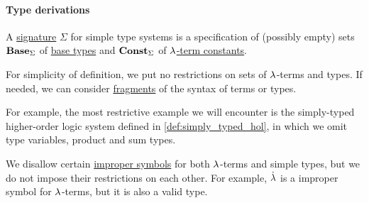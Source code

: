 \paragraph{Type derivations}

\begin{definition}\label{def:simple_type_signature}\mimprovised
  A \hyperref[con:logical_system_signature]{signature} \( \Sigma \) for simple type systems is a specification of (possibly empty) sets \( \op*{Base}_\Sigma \) of \hyperref[def:simple_type]{base types} and \( \op*{Const}_\Sigma \) of \hyperref[def:lambda_term]{\( {\mathrm \lambda} \)-term constants}.
\end{definition}
\begin{comments}
  \item For simplicity of definition, we put no restrictions on sets of \( {\mathrm \lambda} \)-terms and types. If needed, we can consider \hyperref[con:syntax_fragment]{fragments} of the syntax of terms or types.

  For example, the most restrictive example we will encounter is the simply-typed higher-order logic system defined in \cref{def:simply_typed_hol}, in which we omit type variables, product and sum types.

  \item We disallow certain \hyperref[con:improper_symbol]{improper symbols} for both \( {\mathrm \lambda} \)-terms and simple types, but we do not impose their restrictions on each other. For example, \( \mathord{\dot{{\mathrm \lambda}}} \) is a improper symbol for \( {\mathrm \lambda} \)-terms, but it is also a valid type.
\end{comments}

